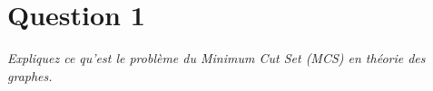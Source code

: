\section{Question 1}
\textit{Expliquez ce qu'est le problème du Minimum Cut Set (MCS) en théorie des graphes.}


